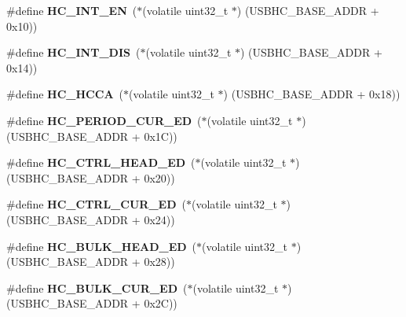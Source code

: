 \begin{DoxyCompactItemize}
\#define {\bfseries H\+C\+\_\+\+I\+N\+T\+\_\+\+EN}~($\ast$(volatile uint32\+\_\+t $\ast$) (U\+S\+B\+H\+C\+\_\+\+B\+A\+S\+E\+\_\+\+A\+D\+DR + 0x10))
\item 
\mbox{\label{group__lpc24xx__regs_ga0ecf71d10be64448aa448d0d2f4dc9b5}} 
\#define {\bfseries H\+C\+\_\+\+I\+N\+T\+\_\+\+D\+IS}~($\ast$(volatile uint32\+\_\+t $\ast$) (U\+S\+B\+H\+C\+\_\+\+B\+A\+S\+E\+\_\+\+A\+D\+DR + 0x14))
\item 
\mbox{\label{group__lpc24xx__regs_ga92e57fa05f3ad6bad2d3f84c293d88b5}} 
\#define {\bfseries H\+C\+\_\+\+H\+C\+CA}~($\ast$(volatile uint32\+\_\+t $\ast$) (U\+S\+B\+H\+C\+\_\+\+B\+A\+S\+E\+\_\+\+A\+D\+DR + 0x18))
\item 
\mbox{\label{group__lpc24xx__regs_ga7054ee7f0cae76b946f2b3ba3dd884a1}} 
\#define {\bfseries H\+C\+\_\+\+P\+E\+R\+I\+O\+D\+\_\+\+C\+U\+R\+\_\+\+ED}~($\ast$(volatile uint32\+\_\+t $\ast$) (U\+S\+B\+H\+C\+\_\+\+B\+A\+S\+E\+\_\+\+A\+D\+DR + 0x1\+C))
\item 
\mbox{\label{group__lpc24xx__regs_ga5ca6f0a8b17a6165e355858e117e9d55}} 
\#define {\bfseries H\+C\+\_\+\+C\+T\+R\+L\+\_\+\+H\+E\+A\+D\+\_\+\+ED}~($\ast$(volatile uint32\+\_\+t $\ast$) (U\+S\+B\+H\+C\+\_\+\+B\+A\+S\+E\+\_\+\+A\+D\+DR + 0x20))
\item 
\mbox{\label{group__lpc24xx__regs_gade35cb1383e75a90f3b04ec394e1f459}} 
\#define {\bfseries H\+C\+\_\+\+C\+T\+R\+L\+\_\+\+C\+U\+R\+\_\+\+ED}~($\ast$(volatile uint32\+\_\+t $\ast$) (U\+S\+B\+H\+C\+\_\+\+B\+A\+S\+E\+\_\+\+A\+D\+DR + 0x24))
\item 
\mbox{\label{group__lpc24xx__regs_ga2730eb9a656e98c7d8137e4e42ad88b2}} 
\#define {\bfseries H\+C\+\_\+\+B\+U\+L\+K\+\_\+\+H\+E\+A\+D\+\_\+\+ED}~($\ast$(volatile uint32\+\_\+t $\ast$) (U\+S\+B\+H\+C\+\_\+\+B\+A\+S\+E\+\_\+\+A\+D\+DR + 0x28))
\item 
\mbox{\label{group__lpc24xx__regs_ga21d84c65d6911bd30459264f0db8a923}} 
\#define {\bfseries H\+C\+\_\+\+B\+U\+L\+K\+\_\+\+C\+U\+R\+\_\+\+ED}~($\ast$(volatile uint32\+\_\+t $\ast$) (U\+S\+B\+H\+C\+\_\+\+B\+A\+S\+E\+\_\+\+A\+D\+DR + 0x2\+C))

\end{DoxyCompactItemize}
